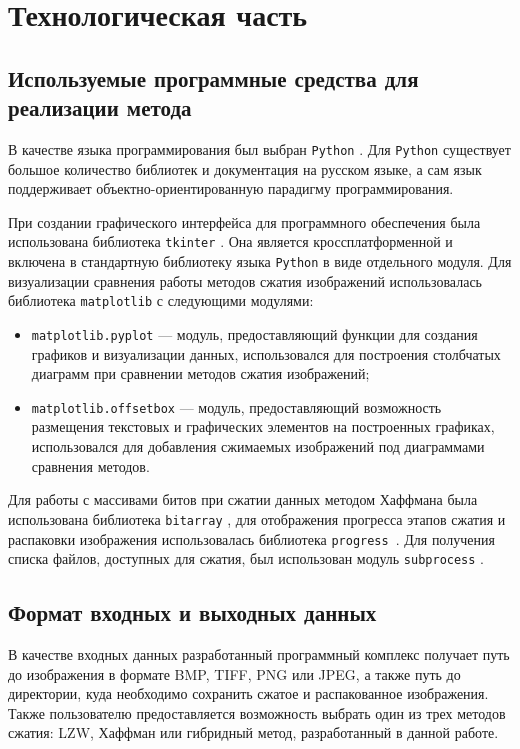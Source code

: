 \chapter{Технологическая часть}

\section{Используемые программные средства для \mbox{реализации} метода}

В качестве языка программирования был выбран \texttt{Python} \cite{Python}. Для \texttt{Python} существует большое количество библиотек и документация на русском языке, а сам язык поддерживает объектно-ориентированную парадигму программирования.

При создании графического интерфейса для программного обеспечения была использована библиотека \texttt{tkinter} \cite{Tkinter}. Она является кроссплатформенной и включена в стандартную библиотеку языка \texttt{Python} в виде отдельного модуля. Для визуализации сравнения работы методов сжатия изображений использовалась библиотека \texttt{matplotlib} \cite{Matplotlib} с следующими модулями:
\begin{itemize}
    \item \texttt{matplotlib.pyplot} \cite{Pyplot} --- модуль, предоставляющий функции для создания графиков и визуализации данных, использовался для построения столбчатых диаграмм при сравнении методов сжатия изображений;
    \item \texttt{matplotlib.offsetbox} \cite{OffsetBox} --- модуль, предоставляющий возможность размещения текстовых и графических элементов на построенных графиках, использовался для добавления сжимаемых изображений под диаграммами сравнения методов.
\end{itemize}

Для работы с массивами битов при сжатии данных методом Хаффмана была использована библиотека \texttt{bitarray} \cite{Bitarray}, для отображения прогресса этапов сжатия и распаковки изображения использовалась библиотека \texttt{progress}~\cite{Progress}. Для получения списка файлов, доступных для сжатия, был использован модуль \texttt{subprocess} \cite{Subprocess}.


\section{Формат входных и выходных данных}

В качестве входных данных разработанный программный комплекс получает путь до изображения в формате BMP, TIFF, PNG или JPEG, а также путь до директории, куда необходимо сохранить сжатое и распакованное изображения. Также пользователю предоставляется возможность выбрать один из трех методов сжатия: LZW, Хаффман или гибридный метод, разработанный в данной работе.

